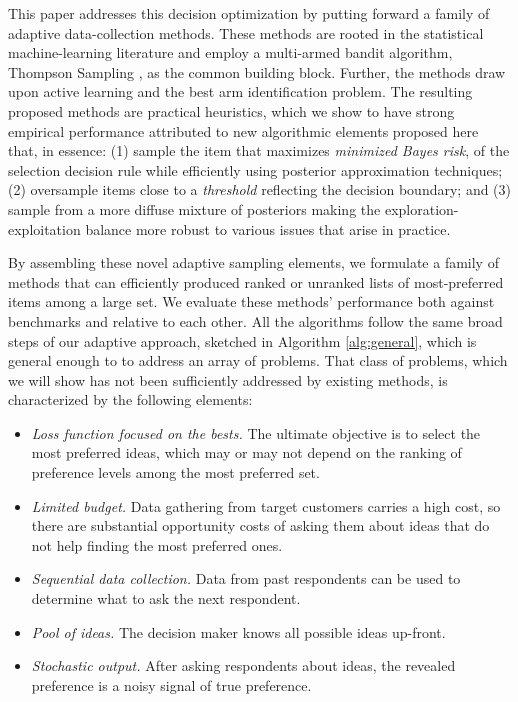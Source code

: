 \documentclass[nonblindrev]{informs3}
\begin{document}
This paper addresses this decision optimization by putting forward a family of adaptive data-collection methods. These methods are rooted in the statistical machine-learning literature and employ a multi-armed bandit algorithm, Thompson Sampling \citep{thompson1933likelihood}, as the common building block. Further, the methods draw upon active learning and the best arm identification problem. The resulting proposed methods are practical heuristics, which we show to have strong empirical performance attributed to new algorithmic elements proposed here that, in essence: (1) sample the item that maximizes \emph{minimized Bayes risk}, of the selection decision rule while efficiently using posterior approximation techniques; (2) oversample items close to a \emph{threshold} reflecting the decision boundary; and (3) sample from a more diffuse mixture of posteriors making the exploration-exploitation balance more robust to various issues that arise in practice. 

By assembling these novel adaptive sampling elements, we formulate a family of methods that can efficiently produced ranked or unranked lists of most-preferred items among a large set. We evaluate these methods' performance both against benchmarks and relative to each other. All the algorithms follow the same broad steps of our adaptive approach, sketched in Algorithm \ref{alg:general}, which is general enough to to address an array of problems. That class of problems, which we will show has not been sufficiently addressed by existing methods, is characterized by the following elements:

\begin{itemize}
\item \emph{Loss function focused on the bests.} The ultimate objective is to select the most preferred ideas, which may or may not depend on the ranking of preference levels among the most preferred set.
\item \emph{Limited budget.} Data gathering from target customers carries a high cost, so there are substantial opportunity costs of asking them about ideas that do not help finding the most preferred ones.
\item \emph{Sequential data collection.} Data from past respondents can be used to determine what to ask the next respondent.
\item \emph{Pool of ideas.} The decision maker knows all possible ideas up-front.
\item \emph{Stochastic output.} After asking respondents about ideas, the revealed preference is a noisy signal of true preference.
\end{itemize}
\end{document}
